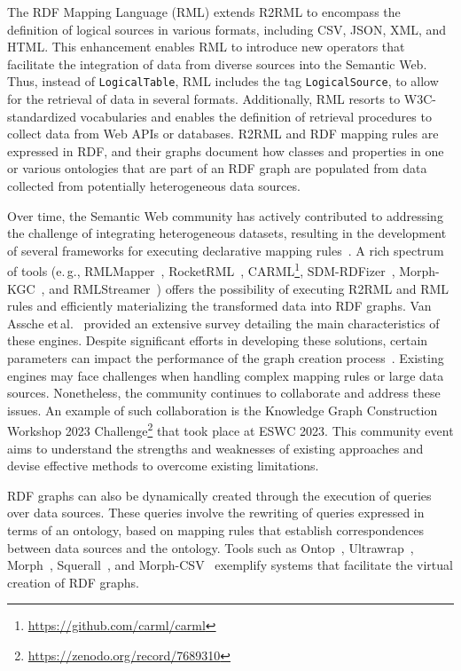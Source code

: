 \documentclass[a4paper,USenglish]{tgdk-v2021}
\begin{document}
The RDF Mapping Language (RML)\cite{DimouSCVMW14} extends R2RML to encompass the definition of logical sources in various formats, including CSV, JSON, XML, and HTML.
This enhancement enables RML to introduce new operators that facilitate the integration of data from diverse sources into the Semantic Web.
Thus, instead of \texttt{LogicalTable}, RML includes the tag \texttt{LogicalSource}, to allow for the retrieval of data in several formats.
Additionally, RML resorts to W3C-standardized vocabularies and enables the definition of retrieval procedures to collect data from Web APIs or databases. R2RML and RDF mapping rules are expressed in RDF, and their graphs document how classes and properties in one or various ontologies that are part of an RDF graph are populated from data collected from potentially heterogeneous data sources. 
 
Over time, the Semantic Web community has actively contributed to addressing the challenge of integrating heterogeneous datasets, resulting in the development of several frameworks for executing declarative mapping rules~\cite{chebotko2009semantics,calvanese2017ontop,DBLP:conf/www/PriyatnaCS14}.
A rich spectrum of tools (e.\,g., RMLMapper~\cite{DimouSCVMW14}, RocketRML~\cite{csimcsek2019rocketrml}, CARML\footnote{\url{https://github.com/carml/carml}}, SDM-RDFizer~\cite{iglesias2020sdm}, Morph-KGC~\cite{arenas2022morph}, and RMLStreamer~\cite{oo2022rmlstreamer}) offers the possibility of executing R2RML and RML rules and efficiently materializing the transformed data into RDF graphs.
Van Assche et\,al.~\cite{DBLP:journals/ws/AsscheDHHMD23} provided an extensive survey detailing the main characteristics of these engines.
Despite significant efforts in developing these solutions, certain parameters can impact the performance of the graph creation process~\cite{Chaves-FragaEIC19}.
Existing engines may face challenges when handling complex mapping rules or large data sources.
Nonetheless, the community continues to collaborate and address these issues.
An example of such collaboration is the Knowledge Graph Construction Workshop 2023 Challenge\footnote{\url{https://zenodo.org/record/7689310}} that took place at ESWC 2023.
This community event aims to understand the strengths and weaknesses of existing approaches and devise effective methods to overcome existing limitations.
 
RDF graphs can also be dynamically created through the execution of queries over data sources. These queries involve the rewriting of queries expressed in terms of an ontology, based on mapping rules that establish correspondences between data sources and the ontology. Tools such as Ontop~\cite{calvanese2017ontop}, Ultrawrap~\cite{DBLP:journals/ws/SequedaM13}, Morph~\cite{DBLP:conf/www/PriyatnaCS14}, Squerall~\cite{mami2019squerall}, and Morph-CSV~\cite{chaves2020enhancing} exemplify systems that facilitate the virtual creation of RDF graphs.
\end{document}

